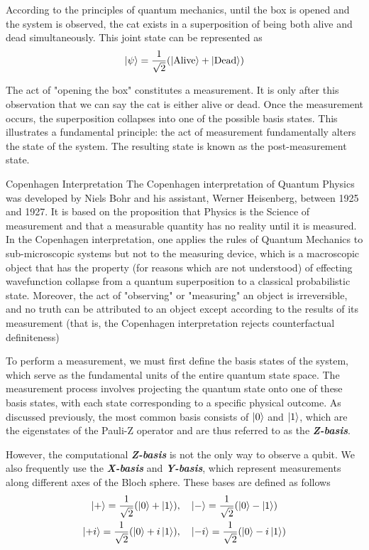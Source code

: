 \documentclass[11pt, letterpaper]{article}
\begin{document}
According to the principles of quantum mechanics, until the box is opened and the system is observed, the cat exists in a superposition of being both alive and dead simultaneously. This joint state can be represented as
\begin{equation}
\ket{\psi} = \frac{1}{\sqrt{2}} (\ket{\text{Alive}} + \ket{\text{Dead}})
\end{equation}

The act of "opening the box" constitutes a measurement. It is only after this observation that we can say the cat is either alive or dead. Once the measurement occurs, the superposition collapses into one of the possible basis states. This illustrates a fundamental principle: the act of measurement fundamentally alters the state of the system. The resulting state is known as the post-measurement state.

\begin{SBUBox}{Copenhagen Interpretation}
The Copenhagen interpretation of Quantum Physics was developed by Niels Bohr and his assistant, Werner Heisenberg, between 1925 and 1927. It is based on the proposition that Physics is the Science of measurement and that a measurable quantity has no reality until it is measured. In the Copenhagen interpretation, one applies the rules of Quantum Mechanics to sub-microscopic systems but not to the measuring device, which is a macroscopic object that has the property (for reasons which are not understood) of effecting wavefunction collapse from a quantum superposition to a classical probabilistic state. Moreover, the act of "observing" or "measuring" an object is irreversible, and no truth can be attributed to an object except according to the results of its measurement (that is, the Copenhagen interpretation rejects counterfactual definiteness)
\end{SBUBox}

To perform a measurement, we must first define the basis states of the system, which serve as the fundamental units of the entire quantum state space. The measurement process involves projecting the quantum state onto one of these basis states, with each state corresponding to a specific physical outcome. As discussed previously, the most common basis consists of $\ket{0}$ and $\ket{1}$, which are the eigenstates of the Pauli-Z operator and are thus referred to as the \textbf{\textit{Z-basis}}.

However, the computational \textbf{\textit{Z-basis}} is not the only way to observe a qubit. We also frequently use the \textbf{\textit{X-basis}} and \textbf{\textit{Y-basis}}, which represent measurements along different axes of the Bloch sphere. These bases are defined as follows
\begin{equation}
  \begin{aligned}
    \ket{+} = \frac{1}{\sqrt{2}}(\ket{0} + \ket{1}), \quad & \ket{-} = \frac{1}{\sqrt{2}}(\ket{0} - \ket{1}) \\
    \ket{+i} = \frac{1}{\sqrt{2}}(\ket{0} + i\ket{1}), \quad & \ket{-i} = \frac{1}{\sqrt{2}}(\ket{0} - i\ket{1})
  \end{aligned}
\label{eq: x_y_basis}
\end{equation}
\end{document}
